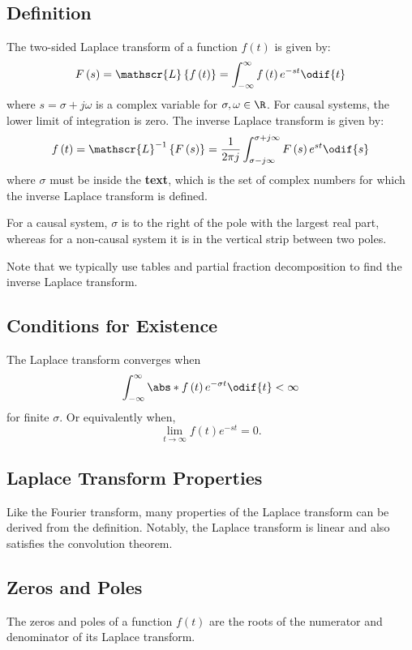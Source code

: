 \documentclass{article}
\begin{document}
\subsection{Definition}
The two-sided Laplace transform of a function \(f\left( t \right)\) is
given by:
\begin{equation*}
    F\left( s \right) = \mathscr{L}\left\{ f\left( t \right) \right\} = \int_{-\infty}^\infty f\left( t \right) e^{-st} \odif{t}
\end{equation*}
where \(s = \sigma + j \omega\) is a complex variable for \(\sigma, \omega \in \R\).
For causal systems, the lower limit of integration is zero.
The inverse Laplace transform is given by:
\begin{equation*}
    f\left( t \right) = \mathscr{L}^{-1}\left\{ F\left( s \right) \right\} = \frac{1}{2\pi j} \int_{\sigma - j\infty}^{\sigma + j\infty} F\left( s \right) e^{st} \odif{s}
\end{equation*}
where \(\sigma\) must be inside the \textbf{text}, which is the
set of complex numbers for which the inverse Laplace transform is defined.

For a causal system, \(\sigma\) is to the right of the pole with the
largest real part, whereas for a non-causal system it is in the
vertical strip between two poles.

Note that we typically use tables and partial fraction decomposition to
find the inverse Laplace transform.
\subsection{Conditions for Existence}
The Laplace transform converges when
\begin{equation*}
    \int_{-\infty}^\infty \abs*{f\left( t \right) e^{-\sigma t}} \odif{t} < \infty
\end{equation*}
for finite \(\sigma\). Or equivalently when,
\begin{equation*}
    \lim_{t \to \infty} f\left( t \right) e^{-s t} = 0.
\end{equation*}
\subsection{Laplace Transform Properties}
Like the Fourier transform, many properties of the Laplace transform
can be derived from the definition. Notably, the Laplace transform is
linear and also satisfies the convolution theorem.
\subsection{Zeros and Poles}
The zeros and poles of a function \(f\left( t \right)\) are the roots
of the numerator and denominator of its Laplace transform.
\end{document}
